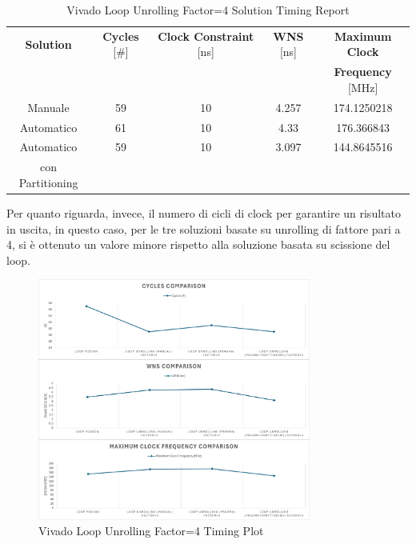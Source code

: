 \begin{table}[H]
    \centering
    \begin{tabular}{|c|c|c|c|c|}
        \hline
        \textbf{Solution} & \textbf{Cycles} [\#] & \textbf{Clock Constraint} [ns] & \textbf{WNS} [ns] & \textbf{Maximum Clock} \\
        & & & & \textbf{Frequency} [MHz] \\
        \hline
        Manuale & 59 & 10 & 4.257 & 174.1250218 \\
        \hline
        Automatico & 61 & 10 & 4.33 & 176.366843 \\
        \hline
        Automatico & 59 & 10 & 3.097 & 144.8645516 \\
        con Partitioning & & & & \\
        \hline
    \end{tabular}
    \caption{Vivado Loop Unrolling Factor=4 Solution Timing Report}
    \label{tab:vivado-loop-unrolling-factor4-solution-timing-report}
\end{table}

Per quanto riguarda, invece, il numero di cicli di clock per garantire un risultato in uscita, in questo caso, per le tre soluzioni basate su unrolling di fattore pari a 4, si è ottenuto un valore minore rispetto alla soluzione basata su scissione del loop. 

\begin{figure}[H]
    \centering
    \includegraphics[width=0.8\textwidth]{solutions/loop_unrolling/factor4/loopunrollingfactor4timing.png}
    \caption{Vivado Loop Unrolling Factor=4 Timing Plot}
    \label{fig:vivado-loop-unrolling-factor4-solution-timing-plot}
\end{figure}

